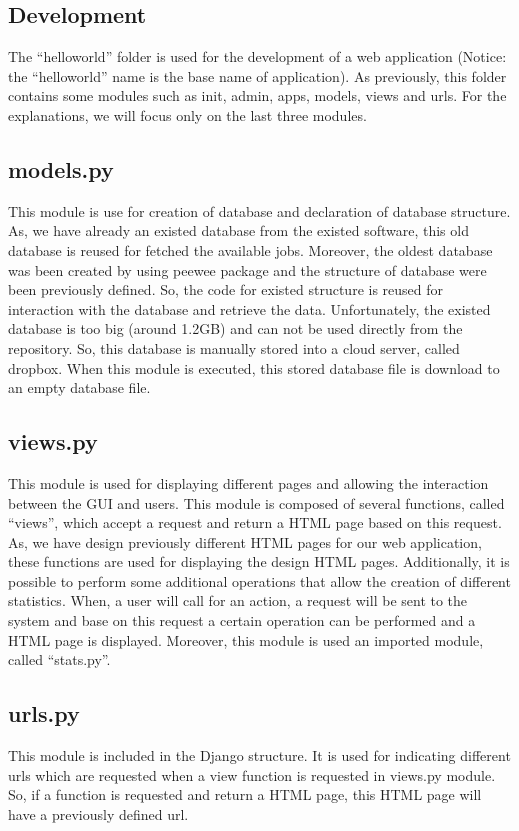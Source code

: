 \documentclass[conference,compsoc]{IEEEtran}
\begin{document}
\subsection{Development}
The “helloworld” folder is used for the development of a web application (Notice: the “helloworld” name is the base name of application). As previously, this folder contains some modules such as init, admin, apps, models, views and urls. For the explanations, we will focus only on the last three modules.

\subsection{models.py}
This module is use for creation of database and declaration of database structure. As, we have already an existed database from the existed software, this old database is reused for fetched the available jobs. Moreover, the oldest database was been created by using peewee package and the structure of database were been previously defined. So, the code for existed structure is reused for interaction with the database and retrieve the data. Unfortunately, the existed database is too big (around 1.2GB) and can not be used directly from the repository. So, this database is manually stored into a cloud server, called dropbox. When this module is executed, this stored database file is download to an empty database file. 

\subsection{views.py}
This module is used for displaying different pages and allowing the interaction between the GUI and users. This module is composed of several functions, called “views”, which accept a request and return a HTML page based on this request. As, we have design previously different HTML pages for our web application, these functions are used for displaying the design HTML pages. Additionally, it is possible to perform some additional operations that allow the creation of different statistics. When, a user will call for an action, a request will be sent to the system and base on this request a certain operation can be performed and a HTML page is displayed. Moreover, this module is used an imported module, called “stats.py”. 

\subsection{urls.py}
This module is included in the Django structure. It is used for indicating different urls which are requested when a view function is requested in views.py module. So, if a function is requested and return a HTML page, this HTML page will have a previously defined url. 
\end{document}
